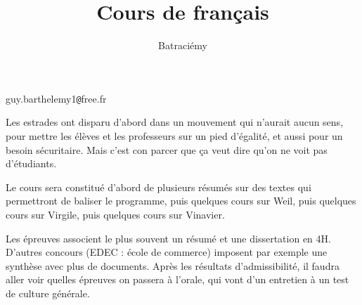 \documentclass[a4paper,12pt]{book}
\title{Cours de français}
\author{Batraciémy}
\begin{document}
guy.barthelemy1\texttt{@}free.fr

\par Les estrades ont disparu d'abord dans un mouvement qui n'aurait aucun sens, pour mettre les élèves et les professeurs sur un pied d'égalité, et aussi pour un besoin sécuritaire. Mais c'est con parcer que ça veut dire qu'on ne voit pas d'étudiants.
\par Le cours sera constitué d'abord de plusieurs résumés sur des textes qui permettront de baliser le programme, puis quelques cours sur Weil, puis quelques cours sur Virgile, puis quelques cours sur Vinavier.
\par Les épreuves associent le plus souvent un résumé et une dissertation en 4H. D'autres concours (EDEC : école de commerce) imposent par exemple une synthèse avec plus de documents. Après les résultats d'admissibilité, il faudra aller voir quelles épreuves on passera à l'orale, qui vont d'un entretien à un test de culture générale.
\end{document}
